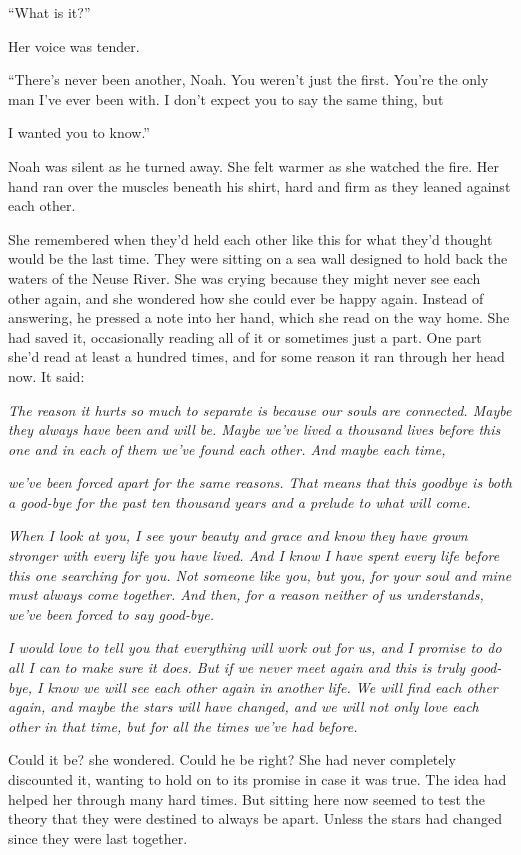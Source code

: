 \documentclass[10pt, twoside, openright]{book}
\begin{document}
``What is it?''

Her voice was tender.


``There's never been another, Noah. You weren't just the first. You're
the only man I've ever been with. I don't expect you to say the same
thing, but

I wanted you to know.''

Noah was silent as he turned away. She felt warmer as she watched the
fire. Her hand ran over the muscles beneath his shirt, hard and firm as
they leaned against each other.

She remembered when they'd held each other like this for what they'd
thought would be the last time. They were sitting on a sea wall designed
to hold back the waters of the Neuse River. She was crying because they
might never see each other again, and she wondered how she could ever be
happy again. Instead of answering, he pressed a note into her hand,
which she read on the way home. She had saved it, occasionally reading
all of it or sometimes just a part. One part she'd read at least a
hundred times, and for some reason it ran through her head now. It said:


\emph{The reason it hurts so much to separate is because our souls are
connected. Maybe they always have been and will be. Maybe we've lived a
thousand lives before this one and in each of them we've found each
other. And maybe each time,}

\emph{we've been forced apart for the same reasons. That means that this
goodbye is both a good-bye for the past ten thousand years and a prelude
to what will come.}

\emph{When I look at you, I see your beauty and grace and know they have
grown stronger with every life you have lived. And I know I have spent
every life before this one searching for you. Not someone like you, but
you, for your soul and mine must always come together. And then, for a
reason neither of us understands, we've been forced to say good-bye.}

\emph{I would love to tell you that everything will work out for us, and
I promise to do all I can to make sure it does. But if we never meet
again and this is truly good-bye, I know we will see each other again in
another life. We will find each other again, and maybe the stars will
have changed, and we will not only love each other in that time, but for
all the times we've had before.}


Could it be? she wondered. Could he be right? She had never completely
discounted it, wanting to hold on to its promise in case it was true.
The idea had helped her through many hard times. But sitting here now
seemed to test the theory that they were destined to always be apart.
Unless the stars had changed since they were last together.
\end{document}
